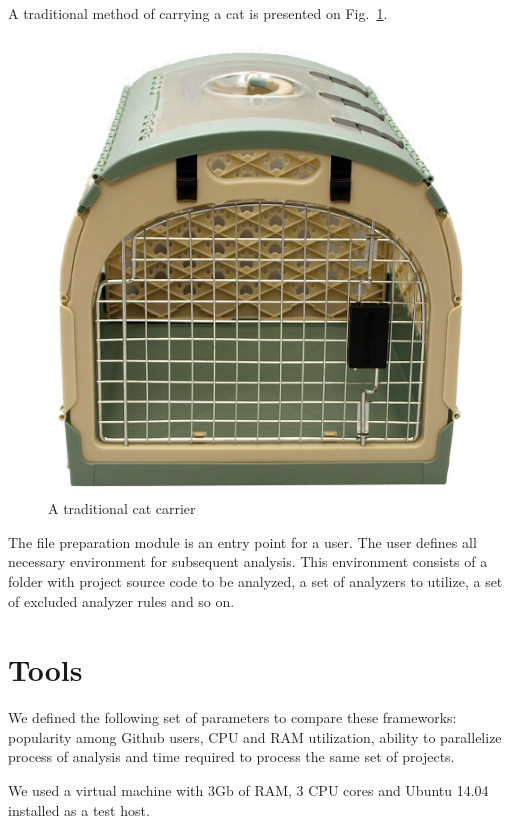 \documentclass[runningheads,a4paper]{llncs}
\begin{document}
A traditional method of carrying a cat is presented on Fig.~\ref{fig:TraditionalCatCarrier}.

%
\begin{figure}
	\centering
	\includegraphics[width=\linewidth]{TraditionalCatCarrier}
	\caption{A traditional cat carrier}
	\label{fig:TraditionalCatCarrier}
\end{figure}
%

The file preparation module is an entry point for a user. The user defines
all necessary environment for subsequent analysis. This environment consists
of a folder with project source code to be analyzed, a set of analyzers
to utilize, a set of excluded analyzer rules and so on.

\section{Tools}

We defined the following set of parameters to compare these frameworks:
popularity among Github \cite{item01} users, CPU and RAM utilization, ability to
parallelize process of analysis and time required to process the same set of projects.

We used a virtual machine with 3Gb of RAM, 3 CPU cores and Ubuntu 14.04
installed as a test host.
\end{document}
